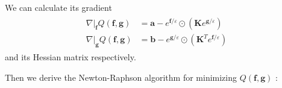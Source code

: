 \documentclass{article}
\begin{document}
\begin{large}
We can calculate its gradient
\begin{align}
\begin{aligned} 
\left. \nabla \right| _ { \mathbf { f } } Q ( \mathbf { f } , \mathbf { g } ) & = \mathbf { a } - e ^ { \mathbf { f } / \varepsilon } \odot \left( \mathbf { K } e ^ { \mathbf { g } / \varepsilon } \right) \\
 \left. \nabla \right| _ { \mathbf { g } } Q ( \mathbf { f } , \mathbf { g } ) & = \mathbf { b } - e ^ { \mathbf { g } / \varepsilon } \odot \left( \mathbf { K } ^ { T } e ^ { \mathbf { f } / \varepsilon } \right) \end{aligned}
 \label{Q_grad}
\end{align}
and its Hessian matrix respectively.
 
Then we derive the Newton-Raphson algorithm for minimizing $ Q ( \mathbf { f } , \mathbf { g } )$ :


\end{large}
\end{document}
